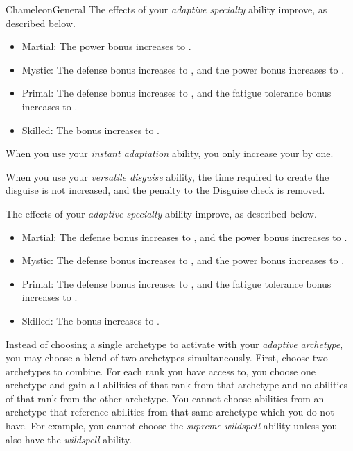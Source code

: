 \begin{feat}{Chameleon}{General}
         The effects of your \textit{adaptive specialty} ability improve, as described below.
        \begin{itemize}
            \item Martial: The power bonus increases to .
            \item Mystic: The defense bonus increases to , and the power bonus increases to .
            \item Primal: The defense bonus increases to , and the fatigue tolerance bonus increases to .
            \item Skilled: The bonus increases to .
        \end{itemize}

         When you use your \textit{instant adaptation} ability,
        you only increase your  by one.

         When you use your \textit{versatile disguise} ability, the time required to create the disguise is not increased, and the penalty to the Disguise check is removed.

         The effects of your \textit{adaptive specialty} ability improve, as described below.
        \begin{itemize}
            \item Martial: The defense bonus increases to , and the power bonus increases to .
            \item Mystic: The defense bonus increases to , and the power bonus increases to .
            \item Primal: The defense bonus increases to , and the fatigue tolerance bonus increases to .
            \item Skilled: The bonus increases to .
        \end{itemize}

         Instead of choosing a single archetype to activate with your \textit{adaptive archetype}, you may choose a blend of two archetypes simultaneously.
        First, choose two archetypes to combine.
        For each rank you have access to, you choose one archetype and gain all abilities of that rank from that archetype and no abilities of that rank from the other archetype.
        You cannot choose abilities from an archetype that reference abilities from that same archetype which you do not have.
        For example, you cannot choose the \textit{supreme wildspell} ability unless you also have the \textit{wildspell} ability.
    \end{feat}

